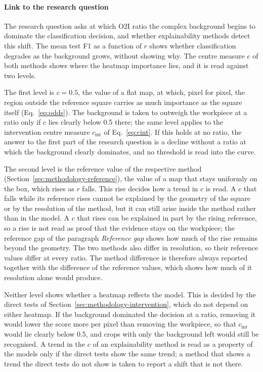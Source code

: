 \paragraph{Link to the research question}
\label{sec:methodology-rq}
The research question asks at which O2I ratio the complex background begins to
dominate the classification decision, and whether explainability methods detect this
shift. The mean test F1 as a function of $r$ shows whether classification degrades as
the background grows, without showing why. The centre measure $c$ of both methods
shows where the heatmap importance lies, and it is read against two levels.

The first level is $c = 0.5$, the value of a flat map, at which, pixel for pixel, the
region outside the reference square carries as much importance as the square itself
(Eq.~\eqref{eq:odds}). The background is taken to outweigh the workpiece at a ratio
only if $c$ lies clearly below 0.5 there; the same level applies to the intervention
centre measure $c_{\mathrm{int}}$ of Eq.~\eqref{eq:cint}. If this holds at no ratio, the answer to the
first part of the research question is a decline without a ratio at which the
background clearly dominates, and no threshold is read into the curve.

The second level is the reference value of the respective method (Section~\ref{sec:methodology-reference}), the value
of a map that stays uniformly on the box, which rises as $r$ falls. This rise decides
how a trend in $c$ is read. A $c$ that falls while its reference rises cannot be
explained by the geometry of the square or by the resolution of the method, but it can
still arise inside the method rather than in the model. A $c$ that rises can be
explained in part by the rising reference, so a rise is not read as proof that the
evidence stays on the workpiece; the reference gap of the paragraph \emph{Reference gap}
shows how much of the rise remains beyond the geometry. The two methods also differ in
resolution, so their reference values differ at every ratio. The method difference is
therefore always reported together with the difference of the reference values, which
shows how much of it resolution alone would produce.

Neither level shows whether a heatmap reflects the model. This is decided by the direct
tests of Section~\ref{sec:methodology-intervention}, which do not depend on either
heatmap. If the background dominated the decision at a ratio, removing it would lower
the score more per pixel than removing the workpiece, so that $c_{\mathrm{int}}$ would
lie clearly below 0.5, and crops with only the background left would still be
recognised. A trend in the $c$ of an explainability method is read as a property of the
models only if the direct tests show the same trend; a method that shows a trend the
direct tests do not show is taken to report a shift that is not there.

